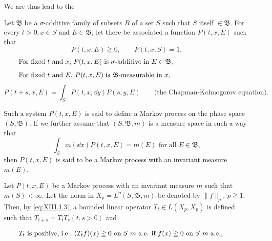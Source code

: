 We are thus lead to the 

\begin{definitionu} Let $\mathfrak{B}$ be a $\sigma$-additive family of subsets $B$ of a set $S$ such that $S$ itself $\in \mathfrak{B}$. For every $t > 0, x \in S$ and $E \in \mathfrak{B}$, let there be associated a function $P(t, x, E)$ such that 
\begin{equation}\label{eq:XIII.1.9}
P(t,x,E)\geqq0,\qquad P(t,x,S)=1,
\end{equation}
\begin{equation}\label{eq:XIII.1.10}
\begin{minipage}{0.92\linewidth}
\everymath{}\let\limits\nolimits
For fixed $t$ and $x$, $P(t,x,E)$ is $\sigma$-additive in $E\in\mathfrak{B}$,
\end{minipage}
\end{equation}
\begin{equation}\label{eq:XIII.1.11}
\begin{minipage}{0.92\linewidth}
\everymath{}\let\limits\nolimits
For fixed $t$ and $E$, $P(t,x,E)$ is $\mathfrak{B}$-measurable in $x$,
\end{minipage}
\end{equation}
\begin{equation}\label{eq:XIII.1.12}
P(t+s,x,E)=\int_S P(t,x,\dd y)P(s,y,E)\qquad\text{(the Chapman-Kolmogorov equation).}
\end{equation}

\end{definitionu}

Such a system $P(t, x, E)$ is said to define a Markov process on the phase space $(S, \mathfrak{B})$. If we further assume that $(S, \mathfrak{B}, m)$ is a measure space in such a way that 
\begin{equation}\label{eq:XIII.1.13}
\int_{S} m (\dd x) P (t, x, E) = m (E) \text{ for all } E \in \mathfrak {B},
\end{equation}
then $P(t, x, E)$ is said to be a Markov process with an invariant measure $m(E)$. 

\begin{theorem}\label{thm:XIII.1.Theorem.1} Let $P(t, x, E)$ be a Markov process with an invariant measure $m$ such that $m(S) < \infty$. Let the norm in $X_{p} = L^{p}(S, \mathfrak{B}, m)$ be denoted by $\|f\|_p$, $p \geqq 1$. Then, by \eqref{eq:XIII.1.3}, a bounded linear operator $T_{t} \in L(X_{p}, X_{p})$ is defined such that $T_{t+s} = T_{t}T_{s} (t, s > 0)$ and 

\begin{equation}\label{eq:XIII.1.14}
\parbox{0.92\linewidth}{\everymath{}\let\limits\nolimits $T_{t}$ is positive, i.e., $(T_{t}f)(x)\geqq 0$ on $S$ $m$-a.e. if $f(x)\geqq 0$ on $S$ $m$-a.e.,}
\end{equation}
\end{theorem}

